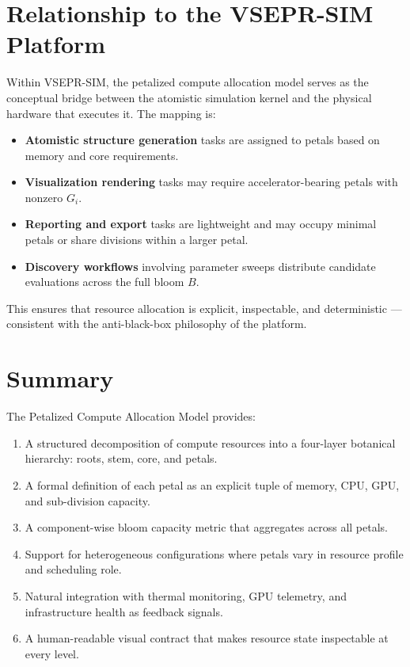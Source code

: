 \documentclass[11pt, a4paper, oneside]{article}
\theoremstyle{definition}
\begin{document}
\section{Relationship to the VSEPR-SIM Platform}

Within VSEPR-SIM, the petalized compute allocation model serves as the
conceptual bridge between the atomistic simulation kernel and the physical
hardware that executes it.  The mapping is:

\begin{itemize}
  \item \textbf{Atomistic structure generation} tasks are assigned to petals
        based on memory and core requirements.
  \item \textbf{Visualization rendering} tasks may require accelerator-bearing
        petals with nonzero $G_i$.
  \item \textbf{Reporting and export} tasks are lightweight and may occupy
        minimal petals or share divisions within a larger petal.
  \item \textbf{Discovery workflows} involving parameter sweeps distribute
        candidate evaluations across the full bloom $B$.
\end{itemize}

This ensures that resource allocation is explicit, inspectable, and
deterministic — consistent with the anti-black-box philosophy of the
platform.

\section{Summary}

The Petalized Compute Allocation Model provides:

\begin{enumerate}
  \item A structured decomposition of compute resources into a four-layer
        botanical hierarchy: roots, stem, core, and petals.
  \item A formal definition of each petal as an explicit tuple of memory,
        CPU, GPU, and sub-division capacity.
  \item A component-wise bloom capacity metric that aggregates across all
        petals.
  \item Support for heterogeneous configurations where petals vary in
        resource profile and scheduling role.
  \item Natural integration with thermal monitoring, GPU telemetry, and
        infrastructure health as feedback signals.
  \item A human-readable visual contract that makes resource state
        inspectable at every level.
\end{enumerate}
\end{document}
